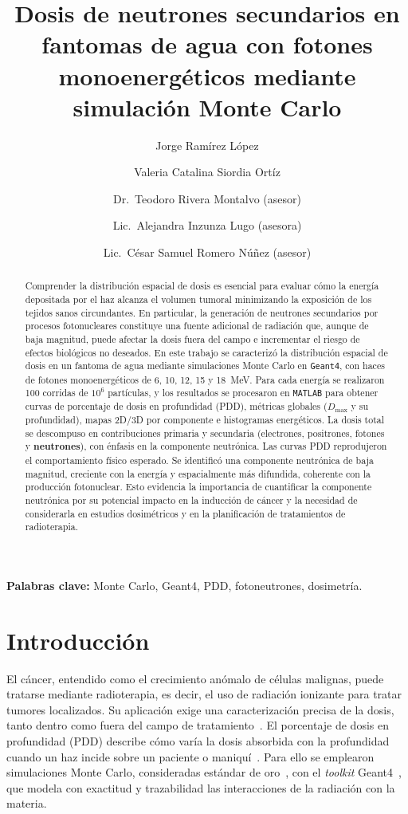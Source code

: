 \documentclass[11pt,a4paper]{article}
\title{\textbf{Dosis de neutrones secundarios en fantomas de agua con fotones
monoenergéticos mediante simulación Monte Carlo}}
\author[1]{Jorge Ramírez López}
\author[2]{Valeria Catalina Siordia Ortíz}
\author[3]{Dr.\ Teodoro Rivera Montalvo (asesor)}
\author[3]{Lic.\ Alejandra Inzunza Lugo (asesora)}
\author[3]{Lic.\ César Samuel Romero Núñez (asesor)}
\affil[1]{Licenciatura en Física, División de Ciencias Básicas, CUCEI, Universidad de Guadalajara \\ \texttt{jorge.ramirez9331@alumnos.udg.mx}}
\affil[2]{Ingeniería Biomédica, Centro Universitario de Tlajomulco, Universidad de Guadalajara}
\affil[3]{Laboratorio de Dosimetría, CICATA Unidad Legaria, Instituto Politécnico Nacional}
\date{}
\begin{document}
\maketitle

\begin{abstract}
\noindent
Comprender la distribución espacial de dosis es esencial para evaluar cómo la
energía depositada por el haz alcanza el volumen tumoral minimizando la exposición
de los tejidos sanos circundantes. En particular, la generación de neutrones
secundarios por procesos fotonucleares constituye una fuente adicional de radiación
que, aunque de baja magnitud, puede afectar la dosis fuera del campo e incrementar
el riesgo de efectos biológicos no deseados. En este trabajo se caracterizó la
distribución espacial de dosis en un fantoma de agua mediante simulaciones Monte
Carlo en \texttt{Geant4}, con haces de fotones monoenergéticos de 6, 10, 12, 15 y
18~MeV. Para cada energía se realizaron 100 corridas de \(10^{6}\) partículas, y los
resultados se procesaron en \texttt{MATLAB} para obtener curvas de porcentaje de
dosis en profundidad (PDD), métricas globales (\(D_{\max}\) y su profundidad), mapas
2D/3D por componente e histogramas energéticos. La dosis total se descompuso en
contribuciones primaria y secundaria (electrones, positrones, fotones y
\textbf{neutrones}), con énfasis en la componente neutrónica. Las curvas PDD
reprodujeron el comportamiento físico esperado. Se identificó una componente
neutrónica de baja magnitud, creciente con la energía y espacialmente más difundida,
coherente con la producción fotonuclear. Esto evidencia la importancia de
cuantificar la componente neutrónica por su potencial impacto en la inducción de
cáncer y la necesidad de considerarla en estudios dosimétricos y en la planificación
de tratamientos de radioterapia.
\end{abstract}

\noindent\textbf{Palabras clave:} Monte Carlo, Geant4, PDD, fotoneutrones, dosimetría.

\section{Introducción}
El cáncer, entendido como el crecimiento anómalo de células malignas, puede tratarse
mediante radioterapia, es decir, el uso de radiación ionizante para tratar tumores
localizados. Su aplicación exige una caracterización precisa de la dosis, tanto
dentro como fuera del campo de tratamiento~\cite{khan2014radiation}. El porcentaje de
dosis en profundidad (PDD) describe cómo varía la dosis absorbida con la profundidad
cuando un haz incide sobre un paciente o maniquí~\cite{khan2014radiation}. Para ello
se emplearon simulaciones Monte Carlo, consideradas estándar de
oro~\cite{fielding2023montecarlo}, con el \textit{toolkit}
Geant4~\cite{agostinelli2003geant4}, que modela con exactitud y trazabilidad las
interacciones de la radiación con la materia.
\end{document}
